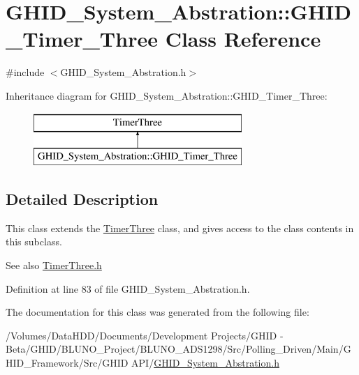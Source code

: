 \hypertarget{class_g_h_i_d___system___abstration_1_1_g_h_i_d___timer___three}{\section{\-G\-H\-I\-D\-\_\-\-System\-\_\-\-Abstration\-:\-:\-G\-H\-I\-D\-\_\-\-Timer\-\_\-\-Three \-Class \-Reference}
\label{class_g_h_i_d___system___abstration_1_1_g_h_i_d___timer___three}
}


{\ttfamily \#include $<$\-G\-H\-I\-D\-\_\-\-System\-\_\-\-Abstration.\-h$>$}

\-Inheritance diagram for \-G\-H\-I\-D\-\_\-\-System\-\_\-\-Abstration\-:\-:\-G\-H\-I\-D\-\_\-\-Timer\-\_\-\-Three\-:\begin{figure}[H]
\begin{center}
\leavevmode
\includegraphics[height=2.000000cm]{class_g_h_i_d___system___abstration_1_1_g_h_i_d___timer___three}
\end{center}
\end{figure}


\subsection{\-Detailed \-Description}
\-This class extends the \hyperlink{class_timer_three}{\-Timer\-Three} class, and gives access to the class contents in this subclass.

\begin{DoxySeeAlso}{\-See also}
\hyperlink{_timer_three_8h}{\-Timer\-Three.\-h} 
\end{DoxySeeAlso}


\-Definition at line 83 of file \-G\-H\-I\-D\-\_\-\-System\-\_\-\-Abstration.\-h.



\-The documentation for this class was generated from the following file\-:\begin{DoxyCompactItemize}
\item 
/\-Volumes/\-Data\-H\-D\-D/\-Documents/\-Development Projects/\-G\-H\-I\-D -\/ Beta/\-G\-H\-I\-D/\-B\-L\-U\-N\-O\-\_\-\-Project/\-B\-L\-U\-N\-O\-\_\-\-A\-D\-S1298/\-Src/\-Polling\-\_\-\-Driven/\-Main/\-G\-H\-I\-D\-\_\-\-Framework/\-Src/\-G\-H\-I\-D A\-P\-I/\hyperlink{_g_h_i_d___system___abstration_8h}{\-G\-H\-I\-D\-\_\-\-System\-\_\-\-Abstration.\-h}\end{DoxyCompactItemize}
